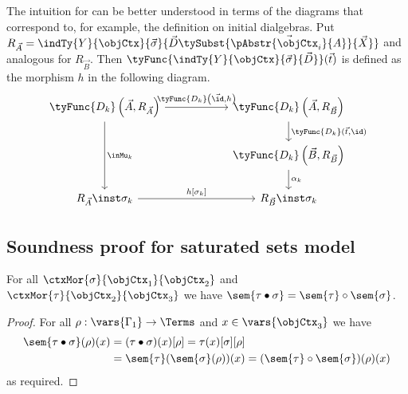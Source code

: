 \documentclass[preprint]{sigplanconf}
\begin{document}
\begin{remark}
  The intuition for  can be better understood in terms of
  the diagrams that correspond to, for example, the definition on initial
  dialgebras.
  Put
  $R_{\vec{A}} = \indTy{Y}{\objCtx}{\vec{\sigma}}{\vec{D}
    \tySubst{\vec{\pAbstr{\objCtx_i}{A}}}{\vec{X}}}$
  and analogous for $R_{\vec{B}}$.
  Then $\tyFunc{\indTy{Y}{\objCtx}{\vec{\sigma}}{\vec{D}}}(\vec{t})$ is defined
  as the morphism $h$ in the following diagram.
  \begin{equation*}
    \begin{tikzcd}[column sep=2cm]
       \tyFunc{D_k} \left(\vec{A}, R_{\vec{A}} \right)
       \rar{\tyFunc{D_k}\left(\vec{\id}, h\right)}
       \arrow{dd}{\inMu_k}
       & \tyFunc{D_k}\left(\vec{A}, R_{\vec{B}} \right)
       \dar{\tyFunc{D_k}(\vec{t}, \id)} \\
       & \tyFunc{D_k}\left(\vec{B}, R_{\vec{B}} \right)
       \dar{\alpha_k} \\
       R_{\vec{A}} \inst \sigma_k
       \rar{h [\sigma_k]}
       & R_{\vec{B}} \inst \sigma_k
    \end{tikzcd}
  \end{equation*}
\end{remark}

\subsection{Soundness proof for saturated sets model}

\begin{lemma}
  \label{lem:interpret-ctx-mor-composition}
  For all $\ctxMor{\sigma}{\objCtx_1}{\objCtx_2}$ and
  $\ctxMor{\tau}{\objCtx_2}{\objCtx_3}$ we have
  $\sem{\tau \bullet \sigma} = \sem{\tau} \circ \sem{\sigma}$.
\end{lemma}
\begin{proof}
  For all $\rho : \vars{\Gamma_1} \to \Terms$ and $x \in \vars{\objCtx_3}$
  we have
  \begin{align*}
    \sem{\tau \bullet \sigma}(\rho)(x)
    & = (\tau \bullet \sigma)(x)[\rho]
    = \tau(x)[\sigma][\rho] \\
    & = \sem{\tau}(\sem{\sigma}(\rho))(x)
    = (\sem{\tau} \circ \sem{\sigma})(\rho)(x)
  \end{align*}
  as required.
\end{proof}
\end{document}

